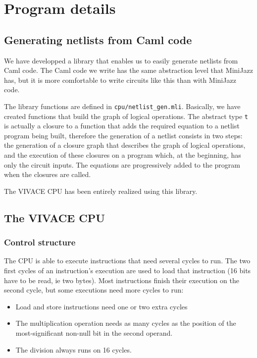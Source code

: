 \documentclass[11pt, a4paper]{article}
\newcommand{\prog}[1]{{\tt#1}}
\begin{document}
\section{Program details}
\subsection{Generating netlists from Caml code}

We have developped a library that enables us to easily generate netlists from Caml code. The Caml code we write
has the same abstraction level that MiniJazz has, but it is more comfortable to write circuits like this than
with MiniJazz code.

The library functions are defined in \prog{cpu/netlist\_gen.mli}. Basically, we have created functions that build
the graph of logical operations. The abstract type \prog{t} is actually a closure to a function that adds the
required equation to a netlist program being built, therefore the generation of a netlist consists in two steps:
the generation of a closure graph that describes the graph of logical operations, and the execution of these
closures on a program which, at the beginning, has only the circuit inputs. The equations are progressively
added to the program when the closures are called.

The VIVACE CPU has been entirely realized using this library.

\subsection{The VIVACE CPU}

\subsubsection{Control structure}

The CPU is able to execute instructions that need several cycles to run. The two first cycles of an instruction's
execution are used to load that instruction (16 bits have to be read, ie two bytes). Most instructions finish
their execution on the second cycle, but some executions need more cycles to run:

\begin{itemize}
    \item Load and store instructions need one or two extra cycles
    \item The multiplication operation needs as many cycles as the position
        of the most-significant non-null bit in the second operand.
    \item The division always runs on 16 cycles.
\end{itemize}
\end{document}
